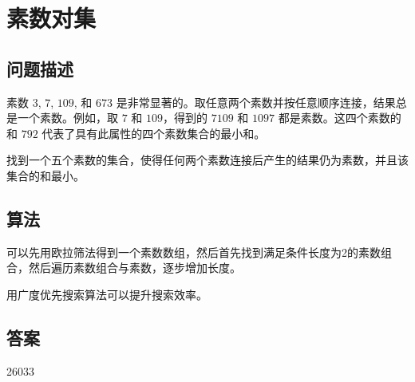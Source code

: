 \section{素数对集}
\subsection{问题描述}
\begin{tcolorbox}
素数 $3$, $7$, $109$, 和 $673$ 是非常显著的。取任意两个素数并按任意顺序连接，结果总是一个素数。例如，取 $7$ 和 $109$，得到的 $7109$ 和 $1097$ 都是素数。这四个素数的和 $792$ 代表了具有此属性的四个素数集合的最小和。

找到一个五个素数的集合，使得任何两个素数连接后产生的结果仍为素数，并且该集合的和最小。
\end{tcolorbox}

\subsection{算法}
可以先用欧拉筛法得到一个素数数组，然后首先找到满足条件长度为2的素数组合，然后遍历素数组合与素数，逐步增加长度。

用广度优先搜索算法可以提升搜索效率。
\subsection{答案}
26033
